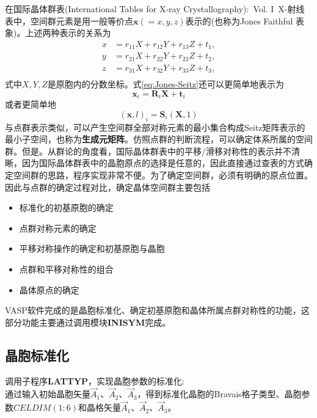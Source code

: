 在国际晶体群表\textrm{(International Tables for X-ray Crystallography):~Vol. I~X-}射线表中，空间群元素是用一般等价点$\mathbf{x}(=x,y,z)$表示的(也称为\textrm{Jones Faithful 表象})。上述两种表示的关系为
\begin{equation}
	\begin{aligned}
		x&=r_{11}X+r_{12}Y+r_{13}Z+t_1,\\
		y&=r_{21}X+r_{22}Y+r_{23}Z+t_2,\\
		z&=r_{31}X+r_{32}Y+r_{33}Z+t_3,\\
	\end{aligned}
	\label{eq:Jones-Seitz}
\end{equation}
式中$X,Y,Z$是原胞内的分数坐标。式\eqref{eq:Jones-Seitz}还可以更简单地表示为
\begin{equation}
	\mathbf{x}_i=\mathbf{R}_i\mathbf{X}+\mathbf{t}_i
	\label{eq:Jones-Seitz-1}
\end{equation}
或者更简单地
\begin{equation}
	(\mathbf{x},l)_i=\mathbf{S}_i(\mathbf{X},1)
	\label{eq:Jones-Seitz-2}
\end{equation}
与点群表示类似，可以产生空间群全部对称元素的最小集合构成\textrm{Seitz}矩阵表示的最小子空间，也称为\textbf{生成元矩阵}。仿照点群的判断流程，可以确定体系所属的空间群。但是。从群论的角度看，国际晶体群表中的平移/滑移对称性的表示并不清晰，因为国际晶体群表中的晶胞原点的选择是任意的，因此直接通过查表的方式确定空间群的思路，程序实现非常不便。为了确定空间群，必须有明确的原点位置。因此与点群的确定过程对比，确定晶体空间群主要包括
\begin{itemize}
	\item 标准化的初基原胞的确定
	\item 点群对称元素的确定
	\item 平移对称操作的确定和初基原胞与晶胞
	\item 点群和平移对称性的组合
	\item 晶体原点的确定
\end{itemize}

\textrm{VASP}软件完成的是晶胞标准化、确定初基原胞和晶体所属点群对称性的功能，这部分功能主要通过调用模块\textbf{INISYM}完成。
\subsection{晶胞标准化}
调用子程序\textbf{LATTYP}，实现晶胞参数的标准化:~\\
通过输入初始晶胞矢量$\vec A_1$、$\vec A_2$、$\vec A_3$，得到标准化晶胞的\textrm{Bravais}格子类型、晶胞参数$\mathit{CELDIM}(1:6)$和晶格矢量$\vec A_1$、$\vec A_2$、$\vec A_3$。

